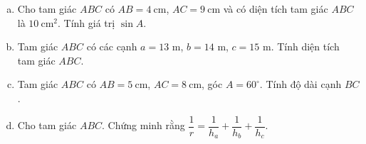 \begin{bt}%
	\begin{enumerate}[a)]
	\item Cho tam giác $ABC$ có $AB=4\mathrm{\ cm} $, $AC=9\mathrm{\ cm} $ và có diện tích tam giác $ABC$ là $10\mathrm{\ cm} $$^2$. Tính giá trị $\sin A$.
	\item Tam giác $ABC$ có các cạnh $a=13$ m, $b=14$ m, $c=15$ m. Tính diện tích tam giác $ABC$.
	\item Tam giác $ABC$ có $AB=5\mathrm{\ cm} $, $AC=8\mathrm{\ cm} $, góc $A=60^\circ$. Tính độ dài cạnh $BC$.
	\item Cho tam giác $ABC$. Chứng minh rằng $\dfrac{1}{r}=\dfrac{1}{h_a}+\dfrac{1}{h_b}+\dfrac{1}{h_c}$.	
	\end{enumerate}


\end{bt}
